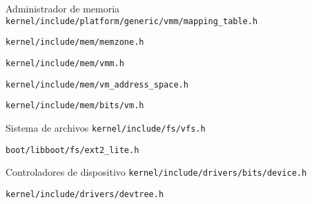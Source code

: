 \begin{frame}{Administrador de memoria}
	\texttt{kernel/include/platform/generic/vmm/mapping\_table.h}
	
	\texttt{kernel/include/mem/memzone.h}
	
	\texttt{kernel/include/mem/vmm.h}
	
	\texttt{kernel/include/mem/vm\_address\_space.h}
	
	\texttt{kernel/include/mem/bits/vm.h}
\end{frame}


\begin{frame}{Sistema de archivos}
	\texttt{kernel/include/fs/vfs.h}
	
	\texttt{boot/libboot/fs/ext2\_lite.h}
\end{frame}


\begin{frame}{Controladores de dispositivo}
	\texttt{kernel/include/drivers/bits/device.h}
	
	\texttt{kernel/include/drivers/devtree.h}
\end{frame}
